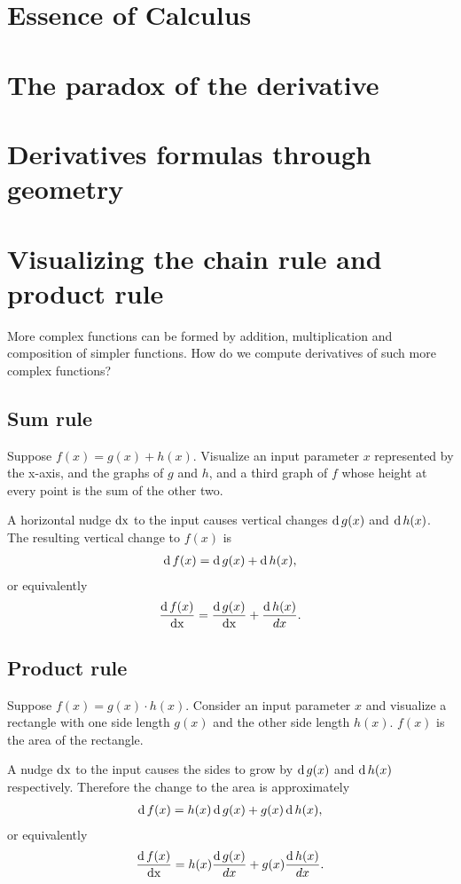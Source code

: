 \documentclass[12pt]{article}
\begin{document}
\section{Essence of Calculus}
\section{The paradox of the derivative}
\section{Derivatives formulas through geometry}
\section{Visualizing the chain rule and product rule}

More complex functions can be formed by addition, multiplication and
composition of simpler functions. How do we compute derivatives of such more
complex functions?

\subsection{Sum rule}
Suppose $f(x) = g(x) + h(x)$. Visualize an input parameter $x$ represented by
the x-axis, and the graphs of $g$ and $h$, and a third graph of $f$ whose
height at every point is the sum of the other two.

A horizontal nudge $\operatorname{\text{dx}}$ to the input causes vertical changes $\operatorname{\text{d}} g(x)$ and
$\operatorname{\text{d}} h(x)$. The resulting vertical change to $f(x)$ is
\begin{align*}
  \operatorname{\text{d}} f(x) = \operatorname{\text{d}} g(x) + \operatorname{\text{d}} h(x),
\end{align*}
or equivalently
\begin{align*}
  \frac{\operatorname{\text{d}} f(x)}{\operatorname{\text{dx}}} = \frac{\operatorname{\text{d}} g(x)}{\operatorname{\text{dx}}} + \frac{\operatorname{\text{d}} h(x)}{dx}.
\end{align*}


\subsection{Product rule}
Suppose $f(x) = g(x) \cdot h(x)$. Consider an input parameter $x$ and visualize a
rectangle with one side length $g(x)$ and the other side length $h(x)$. $f(x)$
is the area of the rectangle.

A nudge $\operatorname{\text{dx}}$ to the input causes the sides to grow by $\operatorname{\text{d}} g(x)$ and $\operatorname{\text{d}} h(x)$
respectively. Therefore the change to the area is approximately
\begin{align*}
  \operatorname{\text{d}} f(x) = h(x) \operatorname{\text{d}} g(x) + g(x) \operatorname{\text{d}} h(x),
\end{align*}
or equivalently
\begin{align*}
  \frac{\operatorname{\text{d}} f(x)}{\operatorname{\text{dx}}} = h(x) \frac{\operatorname{\text{d}} g(x)}{dx} + g(x) \frac{\operatorname{\text{d}} h(x)}{dx}.
\end{align*}
\end{document}
